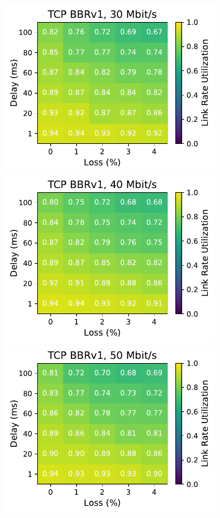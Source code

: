\begin{figure}[ht]
\begin{subfigure}[b]{0.22\linewidth}
        \includegraphics[width=\linewidth,trim={0 0 2cm 0},clip]{figures/heatmaps/heatmap_tcp_bbr1_30mbps.pdf}
        \includegraphics[width=\linewidth,trim={0 0 2cm 0},clip]{figures/heatmaps/heatmap_tcp_bbr1_40mbps.pdf}
        \includegraphics[width=\linewidth,trim={0 0 2cm 0},clip]{figures/heatmaps/heatmap_tcp_bbr1_50mbps.pdf}

\end{subfigure}
\end{figure}
